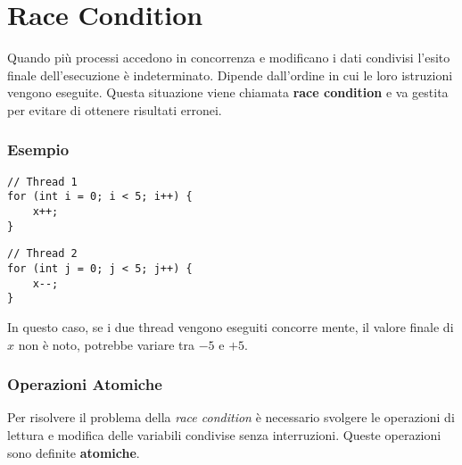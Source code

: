\section{Race Condition}
Quando più processi accedono in concorrenza e modificano i dati condivisi l'esito finale dell'esecuzione è indeterminato. Dipende dall'ordine in cui le loro istruzioni vengono eseguite.
Questa situazione viene chiamata \textbf{race condition} e va gestita per evitare di ottenere risultati erronei.

\subsubsection*{Esempio}

\spacer
\begin{minipage}{0.45\textwidth}
    \begin{verbatim}
// Thread 1
for (int i = 0; i < 5; i++) {
    x++;
}
\end{verbatim}
\end{minipage}
\hfill
\begin{minipage}{0.45\textwidth}
    \begin{verbatim}
// Thread 2
for (int j = 0; j < 5; j++) {
    x--;
}
\end{verbatim}
\end{minipage}
\spacer

In questo caso, se i due thread vengono eseguiti concorre mente, il valore finale di $x$ non è noto, potrebbe variare tra $-5$ e $+5$.

\subsubsection*{Operazioni Atomiche}

Per risolvere il problema della \textit{race condition} è necessario svolgere le operazioni di lettura e modifica delle variabili condivise senza interruzioni. Queste operazioni sono definite \textbf{atomiche}.
